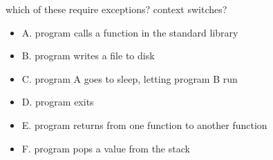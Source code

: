 \begin{frame}{which of these require exceptions? context switches?}
    \begin{itemize}
    \item A. program calls a function in the standard library
    \item B. program writes a file to disk
    \item C. program A goes to sleep, letting program B run
    \item D. program exits
    \item E. program returns from one function to another function
    \item F. program pops a value from the stack
    \end{itemize}
\end{frame}
